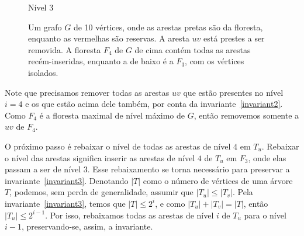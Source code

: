 \begin{figure}[H]
\begin{minipage}[c]{0.8\textwidth}
\begin{tikzpicture}
        \end{tikzpicture}
    \end{minipage}
    \vspace{1cm}
        \noindent
    \begin{minipage}[c]{2cm}
        \raggedright
        Nível $3$
    \end{minipage}%
    \begin{minipage}[c]{0.8\textwidth}
        \centering
    \end{minipage}
    \caption{Um grafo $G$ de 10 vértices, onde as arestas pretas são da floresta, enquanto as vermelhas são reservas. A aresta $uv$ está prestes a ser removida. A floresta $F_{4}$ de $G$ de cima contém todas as arestas recém-inseridas, enquanto a de baixo é a $F_{3}$, com os vértices isolados.}
    \vspace{-1cm}
    \label{fig:example-replacement1}
\end{figure}

Note que precisamos remover todas as arestas $uv$ que estão presentes no nível $i = 4$ e os que estão acima dele também, por conta da invariante~\ref{invariant2}. Como $F_4$ é a floresta maximal de nível máximo de $G$, então removemos somente a $uv$ de $F_4$. 

O próximo passo é rebaixar o nível de todas as arestas de nível $4$ em $T_u$. Rebaixar o nível das arestas significa inserir as arestas de nível $4$ de $T_u$ em $F_3$, onde elas passam a ser de nível $3$. Esse rebaixamento se torna necessário para preservar a invariante~\ref{invariant3}. Denotando $|T|$ como o número de vértices de uma árvore $T$, podemos, sem perda de generalidade, assumir que $|T_u| \leq |T_v|$. Pela invariante~\ref{invariant3}, temos que $|T| \leq 2^i$, e como $|T_u| + |T_v| = |T|$, então $|T_u| \leq 2^{i-1}$. Por isso, rebaixamos todas as arestas de nível $i$ de $T_u$ para o nível $i-1$, preservando-se, assim, a invariante. 


